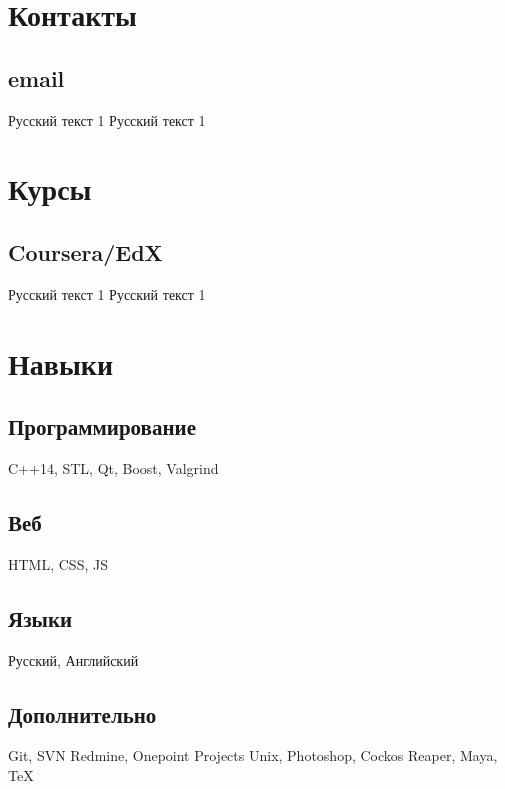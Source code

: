 \documentclass{curricula-vitae}
\begin{document}



\begin{minipage}[t]{0.33\textwidth} %

\section{Контакты} 

\subsection{email}
Русский текст 1
Русский текст 1

\section{Курсы}

\subsection{Coursera/EdX}
Русский текст 1
Русский текст 1

\section{Навыки}

\subsection{Программирование}
C++14, STL, Qt, Boost, Valgrind

\subsection{Веб}
HTML, CSS, JS

\subsection{Языки}

Русский, Английский

\subsection{Дополнительно}
Git, SVN
Redmine, Onepoint Projects
Unix, Photoshop, Cockos Reaper, Maya, TeX

\end{minipage} %
\end{document}
